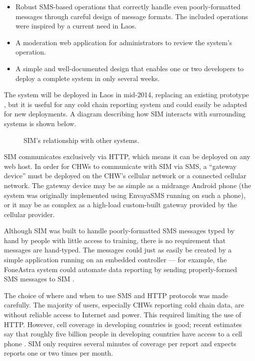 \documentclass{acm_proc_article-sp}
\begin{document}
\begin{itemize}
\item Robust SMS-based operations that correctly handle even poorly-formatted messages through careful design of message formats. The included operations were inspired by a current need in Laos.
\item A moderation web application for administrators to review the system's operation.
\item A simple and well-documented design that enables one or two developers to deploy a complete system in only several weeks.
\end{itemize}

The system will be deployed in Laos in mid-2014, replacing an existing prototype \cite{unicefstories}, but it is useful for any cold chain reporting system and could easily be adapted for new deployments. A diagram describing how SIM interacts with surrounding systems is shown below.

\begin{figure*}
\centering
{}
\caption{SIM's relationship with other systems.}
\end{figure*}

SIM communicates exclusively via HTTP, which means it can be deployed on any web host. In order for CHWs to communicate with SIM via SMS, a ``gateway device'' must be deployed on the CHW's cellular network or a connected cellular network. The gateway device may be as simple as a midrange Android phone (the system was originally implemented using EnvayaSMS running on such a phone), or it may be as complex as a high-load custom-built gateway provided by the cellular provider. 

Although SIM was built to handle poorly-formatted SMS messages typed by hand by people with little access to training, there is no requirement that messages are hand-typed. The messages could just as easily be created by a simple application running on an embedded controller --- for example, the FoneAstra system could automate data reporting by sending properly-formed SMS messages to SIM \cite{foneastra}.

The choice of where and when to use SMS and HTTP protocols was made carefully. The majority of users, especially CHWs reporting cold chain data, are without reliable access to Internet and power. This required limiting the use of HTTP. However, cell coverage in developing countries is good; recent estimates say that roughly five billion people in developing countries have access to a cell phone \cite{worldbank:mobileaccess}. SIM only requires several minutes of coverage per report and expects reports one or two times per month.
\end{document}
